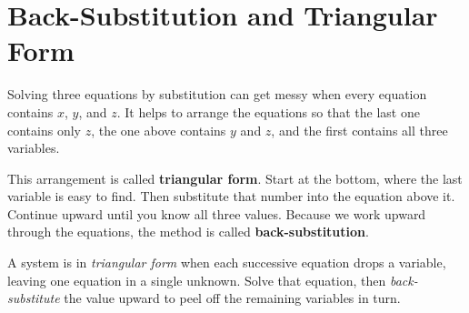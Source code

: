 \documentclass[12pt]{book}
\begin{document}
\begin{center}
\end{center}

\section{Back-Substitution and Triangular Form}

Solving three equations by substitution can get messy when every
equation contains $x$, $y$, and $z$. It helps to arrange the equations
so that the last one contains only $z$, the one above contains $y$
and $z$, and the first contains all three variables.

This arrangement is called \textbf{triangular form}. Start at the bottom,
where the last variable is easy to find. Then substitute that number into
the equation above it. Continue upward until you know all three values.
Because we work upward through the equations, the method is called
\textbf{back-substitution}.


\begin{keyidea}
A system is in \emph{triangular form} when each successive equation drops a variable,
leaving one equation in a single unknown. Solve that equation, then
\emph{back-substitute} the value upward to peel off the remaining variables in turn.
\end{keyidea}
\end{document}
